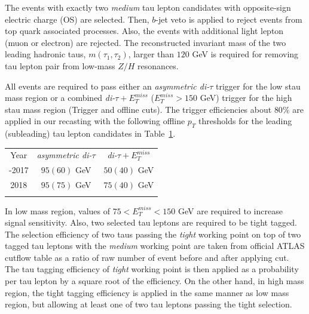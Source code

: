 \documentclass{ws-mpla}
\begin{document}

The events with exactly two \textit{medium} tau lepton candidates with opposite-sign electric charge (OS) are selected. 
Then, $b$-jet veto is applied to reject events from top quark associated processes.
Also, the events with additional light lepton (muon or electron) are rejected.
The reconstructed invariant mass of the two leading {\color{blue}hadronic taus}, $m(\tau_1,\tau_2)$, larger than $120$ GeV is required for removing tau lepton pair from low-mass {\color{blue}$Z/H$ resonances}.

All events are required to pass either an \textit{asymmetric di-$\tau$} trigger for the low stau mass region or a combined \textit{di-$\tau +E^{miss}_T$} ($E^{miss}_T > 150$ GeV) trigger for the high stau mass region (Trigger and offline cuts).
The trigger efficiencies about $80\%$ are applied in our recasting with the following offline $p_T$ thresholds for the leading (subleading) tau lepton candidates in Table~\ref{tab:trig-eff}.

\begin{table}[h!]
  {\begin{tabular}{@{}c c c@{}} \toprule
  Year & \textit{asymmetric di-$\tau$} & \textit{di-$\tau +E^{miss}_T$} \\
  \colrule
 2015-2017 & $95(60)$ GeV & $50(40)$ GeV \\
 2018 & $95(75)$ GeV & $75(40)$ GeV \\ 
  \botrule
  \end{tabular}\label{tab:trig-eff} }
\end{table}

In {\color{blue}low mass} region, values of $75 < E^{miss}_T < 150$ GeV are required to increase signal sensitivity.
Also, two selected tau leptons are required to be tight tagged.
The selection efficiency of two taus passing the \textit{tight} working point on top of two {\color{blue}tagged tau leptons with the \textit{medium} working point are} taken from official ATLAS cutflow table as a ratio of raw number of event before and after applying cut. {\color{blue}The  tau tagging efficiency of \textit{tight} working point} is then applied as a probability per tau lepton by a square root of the efficiency.
On the other hand, in {\color{blue}high mass} region, the tight tagging efficiency is applied in the same manner as {\color{blue}low mass} region, but allowing at least one of two tau leptons passing the tight selection.
\end{document}
